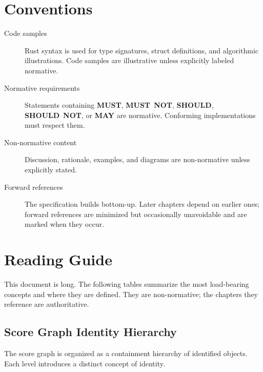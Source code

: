 \documentclass[11pt,letterpaper]{report}
\newcounter{requirement}[chapter]
\newcommand{\MUST}{\textbf{MUST}}
\newcommand{\MUSTNOT}{\textbf{MUST}\nobreak\ \textbf{NOT}}
\newcommand{\SHOULD}{\textbf{SHOULD}}
\newcommand{\SHOULDNOT}{\textbf{SHOULD}\nobreak\ \textbf{NOT}}
\newcommand{\MAY}{\textbf{MAY}}
\begin{document}
\chapter*{Conventions}

\begin{description}
  \item[Code samples] Rust syntax is used for type signatures, struct
    definitions, and algorithmic illustrations. Code samples are
    illustrative unless explicitly labeled normative.
  \item[Normative requirements] Statements containing \MUST, \MUSTNOT,
    \SHOULD, \SHOULDNOT, or \MAY{} are normative. Conforming
    implementations must respect them.
  \item[Non-normative content] Discussion, rationale, examples, and
    diagrams are non-normative unless explicitly stated.
  \item[Forward references] The specification builds bottom-up. Later
    chapters depend on earlier ones; forward references are minimized but
    occasionally unavoidable and are marked when they occur.
\end{description}

\tableofcontents

\clearpage

\chapter*{Reading Guide}

This document is long. The following tables summarize the most
load-bearing concepts and where they are defined. They are
non-normative; the chapters they reference are authoritative.

\section*{Score Graph Identity Hierarchy}

The score graph is organized as a containment hierarchy of
identified objects. Each level introduces a distinct concept of
identity.
\end{document}
